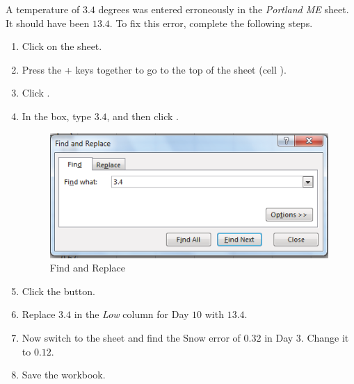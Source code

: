 A temperature of $ 3.4 $ degrees was entered erroneously in the \textit{Portland ME} sheet. It should have been $ 13.4 $. To fix this error, complete the following steps.

\begin{enumbox}
	\begin{enumerate}
		\item Click on the  sheet.
		\item Press the + keys together to go to the top of the sheet (cell ).
		\item Click .
		\item In the  box, type $ 3.4 $, and then click .
	
		\begin{figure}[H]
			\centering
			\includegraphics[width=\maxwidth{.95\linewidth}]{gfx/ch05_fig06}
			\caption{Find and Replace}
			\label{05:fig06}
		\end{figure}

		\item Click the  button.
		\item Replace $ 3.4 $ in the \textit{Low} column for Day $ 10 $ with $ 13.4 $.
		\item Now switch to the  sheet and find the Snow error of $ 0.32 $ in Day $ 3 $. Change it to $ 0.12 $.
		\item Save the  workbook.
	\end{enumerate}
\end{enumbox}
	
